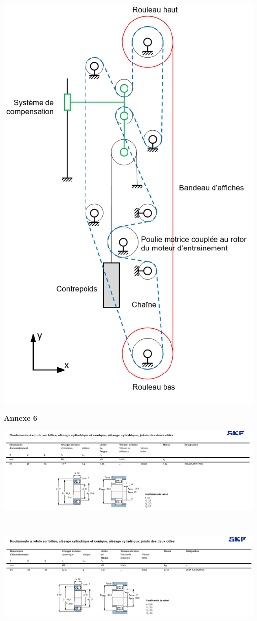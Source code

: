 \begin{center}
 \includegraphics[width=0.8\linewidth]{img/annexe5}
\end{center}

\newpage

\textbf{Annexe 6}

\begin{center}
 \includegraphics[width=0.9\linewidth]{img/annexe6_1}

~\

 \includegraphics[width=0.9\linewidth]{img/annexe6_2}
\end{center}

